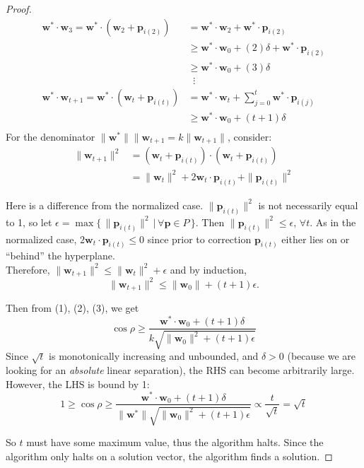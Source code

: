 \documentclass[12pt]{article}
\newcommand{\myvec}[1][v]{\mathbf{#1}}
\newcommand{\vecsub}[2]{\myvec[#1]_{#2}}
\newcommand{\vecsup}[2]{\myvec[#1]^{#2}}
\newcommand{\wsub}[1]{\vecsub{w}{#1}}
\newcommand{\wsubt}{\wsub{t}}
\newcommand{\wsubtt}{\wsub{t+1}}
\newcommand{\wfix}{\vecsup{w}{\ast}}
\newcommand{\psub}[1]{\vecsub{p}{i(#1)}}
\begin{document}
\begin{proof}
\begin{align*}
    \wfix \cdot \wsub{3} = \wfix \cdot (\wsub{2} + \psub{2}) & = \wfix \cdot \wsub{2} + \wfix \cdot \psub{2}\\
    &\geq \wfix \cdot \wsub{0} + (2)\delta + \wfix \cdot \psub{2}\\
    &\geq \wfix \cdot \wsub{0} + (3)\delta\\
    &\;\;\vdots\\
    \wfix \cdot \wsub{t+1} =\wfix \cdot (\wsub{t} + \psub{t}) & = \wfix \cdot \wsub{t} + \sum_{j=0}^{t}\wfix \cdot \psub{j}\\
    &\geq \wfix \cdot \wsub{0} + (t+1)\delta\\
\end{align*}
For the denominator $\|\wfix\|\|\wsubtt = k\|\wsubtt\|$, consider:
\begin{align*}
    \|\wsubtt\|^{2} & = (\wsubt + \psub{t}) \cdot (\wsubt + \psub{t})\\
    & =\|\wsubt\|^{2} + 2\wsubt \cdot \psub{t} + \|\psub{t}\|^{2}
\end{align*}

Here is a difference from the normalized case.  $\|\psub{t}\|^{2}$ is not necessarily equal to 1, so let $\epsilon = \max\{\,\|\psub{t}\|^{2} \,|\, \forall \myvec[p] \in P \,\}$.  Then $\|\psub{t}\|^{2} \leq \epsilon, \, \forall t$.  As in the normalized case, $2\wsubt \cdot \psub{t} \leq 0$ since prior to correction $\psub{t}$ either lies on or ``behind'' the hyperplane.\\
Therefore,
$
    \|\wsubtt\|^{2} \leq \|\wsubt\|^{2} + \epsilon
$
and by induction,
\begin{equation}
    \|\wsubtt\|^{2} \leq \|\wsub{0}\| + (t+1)\epsilon.
\end{equation}

Then from (1), (2), (3), we get
\begin{equation*}
    \cos{\rho} \geq \frac{\wfix \cdot \wsub{0} + (t+1)\delta}{k\sqrt{\|\wsub{0}\|^{2} + (t+1)\epsilon}}
\end{equation*}
Since $\sqrt{t}$ is monotonically increasing and unbounded, and $\delta > 0$ (because we are looking for an \textit{absolute} linear separation), the RHS can become arbitrarily large.  However, the LHS is bound by 1:
\begin{equation*}
    1 \geq \cos{\rho} \geq \frac{\wfix \cdot \wsub{0} + (t+1)\delta}{\|\wfix\|\sqrt{\|\wsub{0}\|^{2} + (t+1)\epsilon}} \varpropto \frac{t}{\sqrt{t}} = \sqrt{t}
\end{equation*}

So $t$ must have some maximum value, thus the algorithm halts.  Since the algorithm only halts on a solution vector, the algorithm finds a solution. 
\end{proof}
\end{document}

